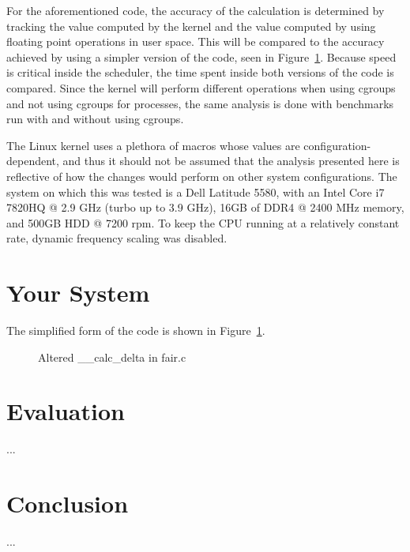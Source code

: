 \documentclass[10pt, conference]{IEEEtran}
\begin{document}
For the aforementioned code, the accuracy of the calculation is determined by tracking the value computed by the kernel and the value computed by using floating point operations in user space.  This will be compared to the accuracy achieved by using a simpler version of the code, seen in Figure~\ref{fig:figure2}.
Because speed is critical inside the scheduler, the time spent inside both versions of the code is compared.  Since the kernel will perform different operations when using cgroups and not using cgroups for processes, the same analysis is done with benchmarks run with and without using cgroups.

The Linux kernel uses a plethora of macros whose values are configuration-dependent, and thus it should not be assumed that the analysis presented here is reflective of how the changes would perform on other system configurations.  The system on which this was tested is a Dell Latitude 5580, with an Intel Core i7 7820HQ @ 2.9 GHz (turbo up to 3.9 GHz), 16GB of DDR4 @ 2400 MHz memory, and 500GB HDD @ 7200 rpm.  To keep the CPU running at a relatively constant rate, dynamic frequency scaling was disabled.

\section{Your System}

The simplified form of the code is shown in Figure~\ref{fig:figure2}.

\begin{figure}[h]
	\centering
	
	\caption{Altered \_\_calc\_delta in fair.c}
	\label{fig:figure2}
\end{figure}

\section{Evaluation}
...
\section{Conclusion}
...

\nocite{*}
\end{document}
